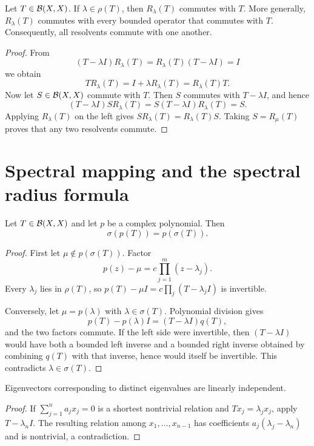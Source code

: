 \begin{noteproposition}
Let $T\in\mathcal{B}(X,X)$.  If $\lambda\in\rho(T)$, then $R_\lambda(T)$ commutes
with $T$.  More generally,
$R_\lambda(T)$ commutes with every bounded operator that commutes with $T$.
Consequently, all resolvents commute with one another.
\end{noteproposition}

\begin{proof}
From
\[
  (T-\lambda I)R_\lambda(T)
  =R_\lambda(T)(T-\lambda I)=I
\]
we obtain
\[
  TR_\lambda(T)=I+\lambda R_\lambda(T)
  =R_\lambda(T)T.
\]
Now let $S\in\mathcal{B}(X,X)$ commute with $T$.  Then $S$ commutes with
$T-\lambda I$, and hence
\[
  (T-\lambda I)SR_\lambda(T)
  =S(T-\lambda I)R_\lambda(T)=S.
\]
Applying $R_\lambda(T)$ on the left gives
$SR_\lambda(T)=R_\lambda(T)S$.  Taking
$S=R_\mu(T)$ proves that any two resolvents commute.
\end{proof}

\section{Spectral mapping and the spectral radius formula}

\begin{notetheorem}
Let $T\in\mathcal{B}(X,X)$ and let $p$ be a complex polynomial.  Then
\[
  \sigma(p(T))=p(\sigma(T)).
\]
\end{notetheorem}

\begin{proof}
First let $\mu\notin p(\sigma(T))$.  Factor
\[
  p(z)-\mu=c\prod_{j=1}^m(z-\lambda_j).
\]
Every $\lambda_j$ lies in $\rho(T)$, so
$p(T)-\mu I=c\prod_j(T-\lambda_jI)$ is invertible.

Conversely, let $\mu=p(\lambda)$ with $\lambda\in\sigma(T)$.  Polynomial
division gives
\[
  p(T)-p(\lambda)I=(T-\lambda I)q(T),
\]
and the two factors commute.  If the left side were invertible, then
$(T-\lambda I)$ would have both a bounded left inverse and a bounded right
inverse obtained by combining $q(T)$ with that inverse, hence would itself be
invertible.  This contradicts $\lambda\in\sigma(T)$.
\end{proof}

\begin{noteproposition}
Eigenvectors corresponding to distinct eigenvalues are linearly independent.
\end{noteproposition}

\begin{proof}
If $\sum_{j=1}^n a_jx_j=0$ is a shortest nontrivial relation and
$Tx_j=\lambda_jx_j$, apply $T-\lambda_nI$.  The resulting relation among
$x_1,\ldots,x_{n-1}$ has coefficients
$a_j(\lambda_j-\lambda_n)$ and is nontrivial, a contradiction.
\end{proof}

